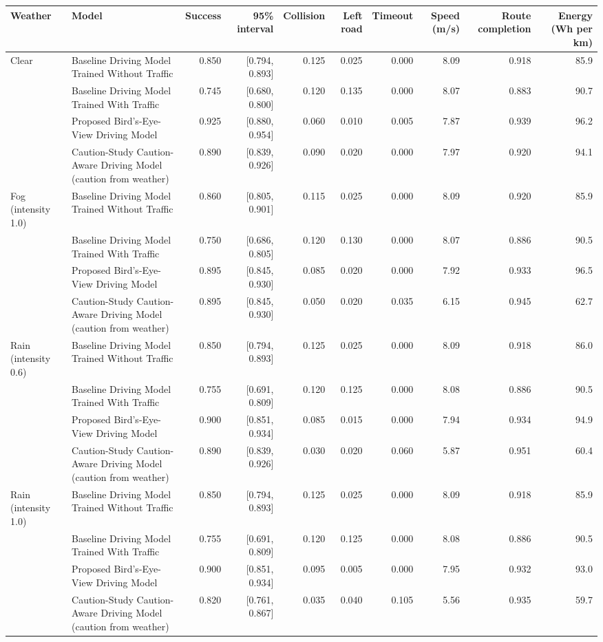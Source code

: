 \begin{tabular}{@{}llrrrrrrrr@{}}\toprule
Weather & Model & Success & 95\% interval & Collision & Left road & Timeout & Speed (m/s) & Route completion & Energy (Wh per km)\\\midrule
Clear & Baseline Driving Model Trained Without Traffic & 0.850 & [0.794, 0.893] & 0.125 & 0.025 & 0.000 & 8.09 & 0.918 & 85.9\\
 & Baseline Driving Model Trained With Traffic & 0.745 & [0.680, 0.800] & 0.120 & 0.135 & 0.000 & 8.07 & 0.883 & 90.7\\
 & Proposed Bird's-Eye-View Driving Model & 0.925 & [0.880, 0.954] & 0.060 & 0.010 & 0.005 & 7.87 & 0.939 & 96.2\\
 & Caution-Study Caution-Aware Driving Model (caution from weather) & 0.890 & [0.839, 0.926] & 0.090 & 0.020 & 0.000 & 7.97 & 0.920 & 94.1\\
\midrule
Fog (intensity 1.0) & Baseline Driving Model Trained Without Traffic & 0.860 & [0.805, 0.901] & 0.115 & 0.025 & 0.000 & 8.09 & 0.920 & 85.9\\
 & Baseline Driving Model Trained With Traffic & 0.750 & [0.686, 0.805] & 0.120 & 0.130 & 0.000 & 8.07 & 0.886 & 90.5\\
 & Proposed Bird's-Eye-View Driving Model & 0.895 & [0.845, 0.930] & 0.085 & 0.020 & 0.000 & 7.92 & 0.933 & 96.5\\
 & Caution-Study Caution-Aware Driving Model (caution from weather) & 0.895 & [0.845, 0.930] & 0.050 & 0.020 & 0.035 & 6.15 & 0.945 & 62.7\\
\midrule
Rain (intensity 0.6) & Baseline Driving Model Trained Without Traffic & 0.850 & [0.794, 0.893] & 0.125 & 0.025 & 0.000 & 8.09 & 0.918 & 86.0\\
 & Baseline Driving Model Trained With Traffic & 0.755 & [0.691, 0.809] & 0.120 & 0.125 & 0.000 & 8.08 & 0.886 & 90.5\\
 & Proposed Bird's-Eye-View Driving Model & 0.900 & [0.851, 0.934] & 0.085 & 0.015 & 0.000 & 7.94 & 0.934 & 94.9\\
 & Caution-Study Caution-Aware Driving Model (caution from weather) & 0.890 & [0.839, 0.926] & 0.030 & 0.020 & 0.060 & 5.87 & 0.951 & 60.4\\
\midrule
Rain (intensity 1.0) & Baseline Driving Model Trained Without Traffic & 0.850 & [0.794, 0.893] & 0.125 & 0.025 & 0.000 & 8.09 & 0.918 & 85.9\\
 & Baseline Driving Model Trained With Traffic & 0.755 & [0.691, 0.809] & 0.120 & 0.125 & 0.000 & 8.08 & 0.886 & 90.5\\
 & Proposed Bird's-Eye-View Driving Model & 0.900 & [0.851, 0.934] & 0.095 & 0.005 & 0.000 & 7.95 & 0.932 & 93.0\\
 & Caution-Study Caution-Aware Driving Model (caution from weather) & 0.820 & [0.761, 0.867] & 0.035 & 0.040 & 0.105 & 5.56 & 0.935 & 59.7\\
\bottomrule\end{tabular}
